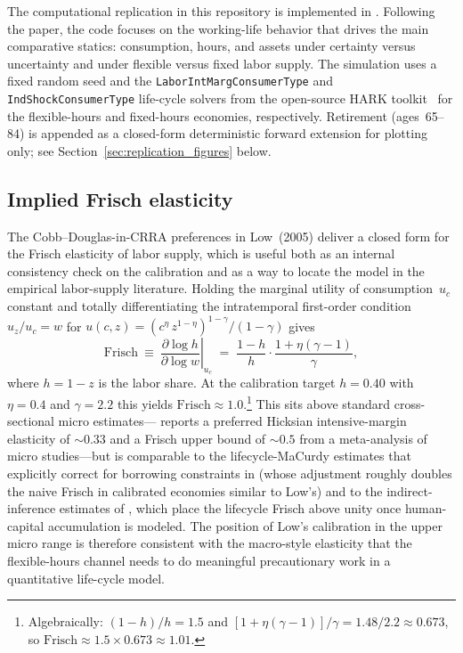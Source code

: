 \documentclass[titlepage, headings=optiontotocandhead]{econark} %
\begin{document}
The computational replication in this repository is implemented in
.
Following the paper, the code focuses on the working-life behavior that drives the main
comparative statics: consumption, hours, and assets under certainty versus uncertainty and
under flexible versus fixed labor supply. The simulation uses a fixed random seed and the
\texttt{LaborIntMargConsumerType} and \texttt{IndShockConsumerType} life-cycle solvers from
the open-source HARK toolkit~\citep{EconARK-HARK} for the flexible-hours and fixed-hours
economies, respectively. Retirement (ages~65--84) is
appended as a closed-form deterministic forward extension for plotting only; see
Section~\ref{sec:replication_figures} below.

\subsection{Implied Frisch elasticity}\label{sec:frisch}
The Cobb--Douglas-in-CRRA preferences in Low~(2005) deliver a closed
form for the Frisch elasticity of labor supply, which is useful both as
an internal consistency check on the calibration and as a way to
locate the model in the empirical labor-supply literature. Holding the
marginal utility of consumption~$u_c$ constant and totally
differentiating the intratemporal first-order condition
$u_z/u_c = w$ for $u(c,z) = (c^{\eta}\,z^{1-\eta})^{1-\gamma}/(1-\gamma)$
gives
\begin{equation}\label{eq:frisch}
  \mathrm{Frisch}\ \equiv\ \left.\frac{\partial \log h}{\partial \log w}\right|_{u_c}
  \;=\; \frac{1-h}{h}\cdot\frac{1+\eta(\gamma-1)}{\gamma},
\end{equation}
where $h = 1-z$ is the labor share. At the calibration target
$h = 0.40$ with $\eta = 0.4$ and $\gamma = 2.2$ this yields
$\mathrm{Frisch}\approx 1.0$.\footnote{Algebraically:
$(1-h)/h = 1.5$ and $[1+\eta(\gamma-1)]/\gamma = 1.48/2.2 \approx 0.673$,
so $\mathrm{Frisch} \approx 1.5\times 0.673 \approx 1.01$.}
This sits above standard cross-sectional micro estimates---\citet{Chetty2012Low}
reports a preferred Hicksian intensive-margin elasticity of
$\sim 0.33$ and a Frisch upper bound of $\sim 0.5$ from a meta-analysis
of micro studies---but is comparable to the lifecycle-MaCurdy
estimates that explicitly correct for borrowing constraints in
\citet{DomeijFloden2006Low} (whose adjustment roughly doubles the
naive Frisch in calibrated economies similar to Low's) and to the
indirect-inference estimates of \citet{ImaiKeane2004Low}, which place
the lifecycle Frisch above unity once human-capital accumulation is
modeled. The position of Low's calibration in the upper micro range
is therefore consistent with the macro-style elasticity that the
flexible-hours channel needs to do meaningful precautionary work in a
quantitative life-cycle model.
\end{document}
